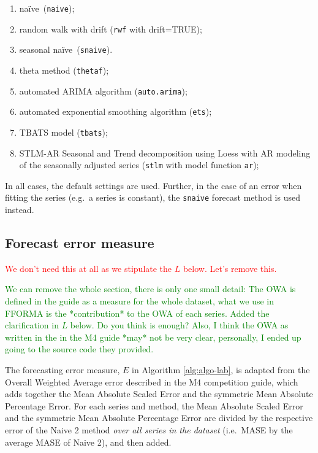 \documentclass[11pt,a4paper,]{article}
\providecommand{\tightlist}{%
  \setlength{\itemsep}{0pt}\setlength{\parskip}{0pt}}
\def\naive{na\"{i}ve}
\theoremstyle{definition}
\theoremstyle{definition}
\theoremstyle{definition}
\theoremstyle{remark}
\begin{document}
\begin{enumerate}
\def\labelenumi{\roman{enumi}.}
\tightlist
\item
  \naive~(\texttt{naive});
\item
  random walk with drift (\texttt{rwf} with drift=TRUE);
\item
  seasonal \naive~(\texttt{snaive}).
\item
  theta method (\texttt{thetaf});
\item
  automated ARIMA algorithm (\texttt{auto.arima});
\item
  automated exponential smoothing algorithm (\texttt{ets});
\item
  TBATS model (\texttt{tbats});
\item
  STLM-AR Seasonal and Trend decomposition using Loess with AR modeling
  of the seasonally adjusted series (\texttt{stlm} with model function
  \texttt{ar});
\end{enumerate}

In all cases, the default settings are used. Further, in the case of an
error when fitting the series (e.g.~a series is constant), the
\texttt{snaive} forecast method is used instead.

\subsection{Forecast error measure}\label{forecast-error-measure}

\textcolor{red}{We don't need this at all as we stipulate the $L$  below. Let's remove this.}

\textcolor{green}{We can remove the whole section, there is only one small detail:
The OWA is defined in the guide as a measure for the whole dataset, what we use in FFORMA is the *contribution* to the OWA of each series.
Added the clarification in $L$ below. Do you think is enough?
Also, I think the OWA as written in the in the M4 guide *may* not be very clear, personally, I ended up going to the source code they provided.
}

The forecasting error measure, \(E\) in Algorithm \ref{alg:algo-lab}, is
adapted from the Overall Weighted Average error described in the M4
competition guide, which adds together the Mean Absolute Scaled Error
and the symmetric Mean Absolute Percentage Error. For each series and
method, the Mean Absolute Scaled Error and the symmetric Mean Absolute
Percentage Error are divided by the respective error of the Naive 2
method \emph{over all series in the dataset} (i.e.~MASE by the average
MASE of Naive 2), and then added.
\end{document}
